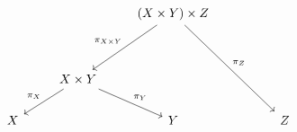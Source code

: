 \[\begin{tikzcd}
	&& {(X \times Y) \times Z} \\
	\\
	& {X \times Y} \\
	X && Y && Z
	\arrow["{\pi_{X \times Y}}"', from=1-3, to=3-2]
	\arrow["{\pi_{X}}"', from=3-2, to=4-1]
	\arrow["{\pi_{Y}}", from=3-2, to=4-3]
	\arrow["{\pi_{Z}}", from=1-3, to=4-5]
\end{tikzcd}\]